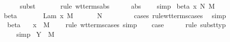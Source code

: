 \begin{isabellebody}
\ \ \ \ \isamarkupfalse%
\ {\isacharparenleft}subst\ {}{\isacharparenleft}{}{\isacharparenright}{\isacharparenright}\isanewline
\ \ \ \ \isamarkupfalse%
\ {\isacharparenleft}rule\ wt{\isacharunderscore}terms{\isachardot}abs{\isacharparenright}\isanewline
\ \ \ \ \isamarkupfalse%
\ abs\ {}\ {}\ \isamarkupfalse%
\ simp{\isacharplus}\isanewline
{}\isamarkupfalse%
\isanewline
{}\isamarkupfalse%
\ {\isacharparenleft}beta\ x\ N\ M{\isacharparenright}\ \isanewline
\ \ \isamarkupfalse%
\ beta{\isacharparenleft}{}{\isacharparenright}\ \isamarkupfalse%
\ {\isasymtau}\ \ {}{\isacharcolon}\ {\isachardoublequoteopen}{\isasymGamma}\ {\isasymturnstile}\ Lam\ {\isacharbrackleft}x{\isacharbrackright}{\isachardot}\ M\ {\isacharcolon}\ {\isasymtau}\ {\isasymrightarrow}\ {\isasymsigma}{\isachardoublequoteclose}\ {\isachardoublequoteopen}{\isasymGamma}\ {\isasymturnstile}\ N\ {\isacharcolon}\ {\isasymtau}{\isachardoublequoteclose}\ \isanewline
\ \ \ \ \isamarkupfalse%
\ {\isacharparenleft}cases\ rule{\isacharcolon}wt{\isacharunderscore}terms{\isachardot}cases{\isacharparenright}\ \isamarkupfalse%
\ simp\isanewline
\ \ \isamarkupfalse%
\ {}{\isacharparenleft}{}{\isacharparenright}\ beta{\isacharparenleft}{}{\isacharparenright}\ \isamarkupfalse%
\ {}{\isacharcolon}\ {\isachardoublequoteopen}{\isacharparenleft}{\isacharparenleft}x{\isacharcomma}{\isasymtau}{\isacharparenright}{\isacharhash}{\isasymGamma}{\isacharparenright}\ {\isasymturnstile}\ M\ {\isacharcolon}\ {\isasymsigma}{\isachardoublequoteclose}\ \isamarkupfalse%
\ {\isacharparenleft}rule\ wt{\isacharunderscore}terms{\isacharunderscore}cases{\isacharunderscore}{}{\isacharcomma}\ simp{\isacharparenright}\isanewline
\ \ \isamarkupfalse%
\ {\isacharquery}case\isanewline
\ \ \ \ \isamarkupfalse%
\ {\isacharparenleft}rule\ subst{\isacharunderscore}typ{\isacharparenright}\isanewline
\ \ \ \ \isamarkupfalse%
\ {}\ {}{\isacharparenleft}{}{\isacharparenright}\ \isamarkupfalse%
\ simp{\isacharplus}\isanewline
{}\isamarkupfalse%
\isanewline
{}\isamarkupfalse%
\ {\isacharparenleft}Y\ {\isasymtau}\ M{\isacharparenright}\isanewline
\ \ \isamarkupfalse%

\end{isabellebody}
